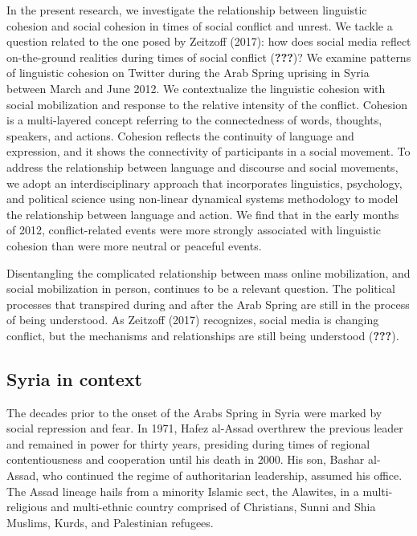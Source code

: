 \documentclass[english,man]{apa6}
\begin{document}
In the present research, we investigate the relationship between linguistic cohesion and social cohesion in times of social conflict and unrest. We tackle a question related to the one posed by Zeitzoff (2017): how does social media reflect on-the-ground realities during times of social conflict ({\textbf{???}})? We examine patterns of linguistic cohesion on Twitter during the Arab Spring uprising in Syria between March and June 2012. We contextualize the linguistic cohesion with social mobilization and response to the relative intensity of the conflict. Cohesion is a multi-layered concept referring to the connectedness of words, thoughts, speakers, and actions. Cohesion reflects the continuity of language and expression, and it shows the connectivity of participants in a social movement. To address the relationship between language and discourse and social movements, we adopt an interdisciplinary approach that incorporates linguistics, psychology, and political science using non-linear dynamical systems methodology to model the relationship between language and action. We find that in the early months of 2012, conflict-related events were more strongly associated with linguistic cohesion than were more neutral or peaceful events.

Disentangling the complicated relationship between mass online mobilization, and social mobilization in person, continues to be a relevant question. The political processes that transpired during and after the Arab Spring are still in the process of being understood. As Zeitzoff (2017) recognizes, social media is changing conflict, but the mechanisms and relationships are still being understood ({\textbf{???}}).

\hypertarget{syria-in-context}{%
\subsection{Syria in context}\label{syria-in-context}}

The decades prior to the onset of the Arabs Spring in Syria were marked by social repression and fear. In 1971, Hafez al-Assad overthrew the previous leader and remained in power for thirty years, presiding during times of regional contentiousness and cooperation until his death in 2000. His son, Bashar al-Assad, who continued the regime of authoritarian leadership, assumed his office. The Assad lineage hails from a minority Islamic sect, the Alawites, in a multi-religious and multi-ethnic country comprised of Christians, Sunni and Shia Muslims, Kurds, and Palestinian refugees.
\end{document}
